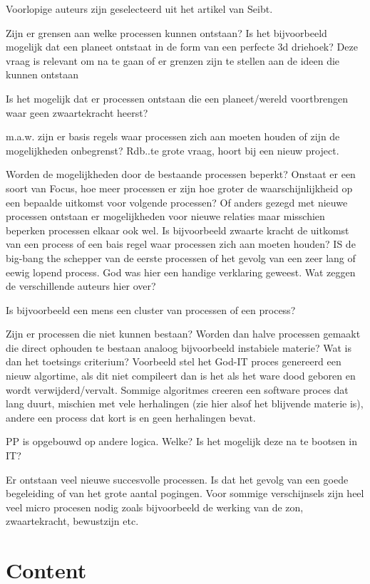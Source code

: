 \documentclass[a4paper]{Thesis}
\begin{document}
Voorlopige auteurs zijn geselecteerd uit het artikel van Seibt.

Zijn er grensen aan welke processen kunnen ontstaan? Is het bijvoorbeeld mogelijk dat een planeet ontstaat in de form van een perfecte 3d driehoek?
Deze vraag is relevant om na te gaan of er grenzen zijn te stellen aan de ideen die kunnen ontstaan

Is het mogelijk dat er processen ontstaan die een planeet/wereld voortbrengen waar geen zwaartekracht heerst?

m.a.w. zijn er basis regels waar processen zich aan moeten houden of zijn de mogelijkheden onbegrenst? 
Rdb..te grote vraag, hoort bij een nieuw project.

Worden de mogelijkheden door de bestaande processen beperkt? Onstaat er een soort van Focus, hoe meer processen er zijn hoe groter de waarschijnlijkheid op een bepaalde uitkomst voor volgende processen? Of anders gezegd met nieuwe processen ontstaan er mogelijkheden voor nieuwe relaties maar misschien beperken processen elkaar ook wel.
Is bijvoorbeeld zwaarte kracht de uitkomst van een process of een bais regel waar processen zich aan moeten houden?
IS de big-bang the schepper van de eerste processen of het gevolg van een zeer lang of eewig lopend process. God was hier een handige verklaring geweest.
Wat zeggen de verschillende auteurs hier over?

Is bijvoorbeeld een mens een cluster van processen of een process?

Zijn er processen die niet kunnen bestaan? Worden dan halve processen gemaakt die direct ophouden te bestaan analoog bijvoorbeeld instabiele materie?
Wat is dan het toetsings criterium? Voorbeeld stel het God-IT proces genereerd een nieuw algortime, als dit niet compileert dan is het als het ware dood geboren en wordt verwijderd/vervalt. Sommige algoritmes creeren een software proces dat lang duurt, mischien met vele herhalingen (zie hier alsof het blijvende materie is), andere een process dat kort is en geen herhalingen bevat.

PP is opgebouwd op andere logica. Welke? Is het mogelijk deze na te bootsen in IT?

Er ontstaan veel nieuwe succesvolle processen. Is dat het gevolg van een goede begeleiding of van het grote aantal pogingen. Voor sommige verschijnsels zijn heel veel micro procesen nodig zoals bijvoorbeeld de werking van de zon, zwaartekracht, bewustzijn etc.


\section{Content}
\end{document}
